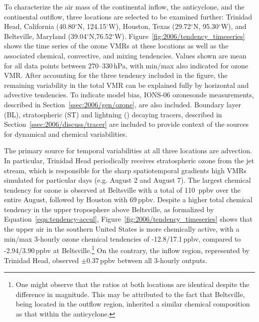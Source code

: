To characterize the air mass of the continental inflow, the anticyclone, and the continental outflow, three locations are selected to be
examined further: Trinidad Head, California (40.80$^\circ$N, 124.15$^\circ$W), Houston, Texas (29.72$^\circ$N, 95.30$^\circ$W),
and Beltsville, Maryland (39.04$^\circ$N,76.52$^\circ$W). Figure~\ref{fig:2006/tendency_timeseries} shows the time series of the
ozone VMRs at these locations as well as the associated chemical, convective, and mixing tendencies. Values shown are mean for
all data points between 270--330\,\unit{hPa}, with min/max also indicated for ozone VMR. After accounting for the three tendency
included in the figure, the remaining variability in the total VMR can be explained fully by horizontal and advective tendencies.
To indicate model bias, IONS-06 ozonesonde measurements, described in Section~\ref{ssec:2006/gen/ozone}, are also included.
Boundary layer (BL), stratospheric (ST) and lightning (\lnox) decaying tracers, described in Section~\ref{ssec:2006/discuss/tracer}
are included to provide context of the sources for dynamical and chemical variabilities.

The primary source for temporal variabilities at all three locations are advection. In particular, Trinidad Head periodically receives
stratospheric ozone from the jet stream, which is responsible for the sharp spatiotemporal gradients high VMRs simulated for particular
days (e.g. August 2 and August 7). The largest chemical tendency for ozone is observed at Beltsville with a total of 110 \,\unit{ppbv}
over the entire August, followed by Houston with 69\,\unit{ppbv}. Despite a higher total chemical tendency in the upper troposphere above
Beltsville, as formalized by Equation~\ref{eqn:tendency-accul}, Figure~\ref{fig:2006/tendency_timeseries} shows that the upper air
in the southern United States is more chemically active, with a min/max 3-hourly ozone chemical tendencies of -12.8/17.1\,\unit{ppbv},
compared to -2.94/3.90\,\unit{ppbv} at Beltsville.\footnote{One might observe that the ratios at both locations are identical despite the
difference in magnitude. This may be attributed to the fact that Beltsville, being located in the outflow region, inherited a similar chemical
composition as that within the anticyclone.} On the contrary, the inflow region, represented by Trinidad Head, observed $\pm0.37$\,\unit{ppbv}
between all 3-hourly outputs.

